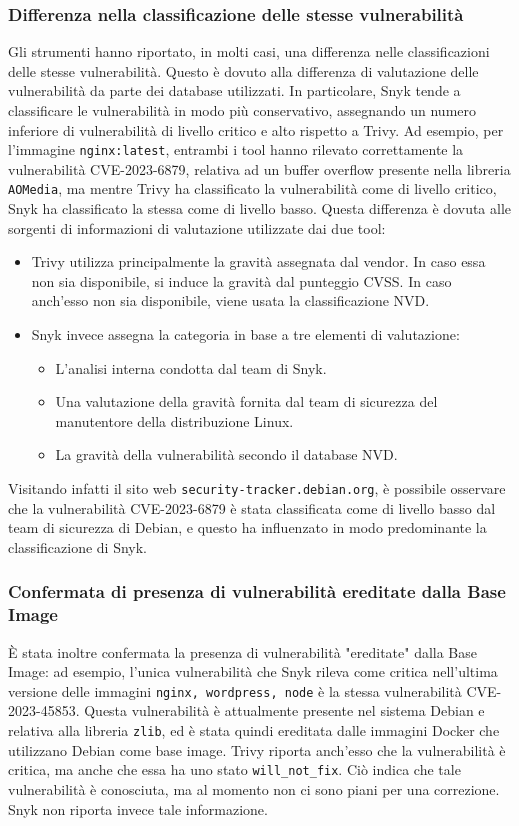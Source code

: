 \subsubsection{Differenza nella classificazione delle stesse vulnerabilità}
Gli strumenti hanno riportato, in molti casi, una differenza nelle classificazioni delle stesse vulnerabilità. Questo è dovuto alla differenza di valutazione delle vulnerabilità da parte dei database utilizzati. In particolare, Snyk tende a classificare le vulnerabilità in modo più conservativo, assegnando un numero inferiore di vulnerabilità di livello critico e alto rispetto a Trivy. Ad esempio, per l'immagine \texttt{nginx:latest}, entrambi i tool hanno rilevato correttamente la vulnerabilità CVE-2023-6879, relativa ad un buffer overflow presente nella libreria \texttt{AOMedia}, ma mentre Trivy ha classificato la vulnerabilità come di livello critico, Snyk ha classificato la stessa come di livello basso. Questa differenza è dovuta alle sorgenti di informazioni di valutazione utilizzate dai due tool:
\begin{itemize}
   \item Trivy utilizza principalmente la gravità assegnata dal vendor. In caso essa non sia disponibile, si induce la gravità dal punteggio CVSS. In caso anch'esso non sia disponibile, viene usata la classificazione NVD.
   \item Snyk invece assegna la categoria in base a tre elementi di valutazione:
         \begin{itemize}
            \item L'analisi interna condotta dal team di Snyk.
            \item Una valutazione della gravità fornita dal team di sicurezza del manutentore della distribuzione Linux.
            \item La gravità della vulnerabilità secondo il database NVD.
         \end{itemize}
\end{itemize}
Visitando infatti il sito web \texttt{security-tracker.debian.org}, è possibile osservare che la vulnerabilità CVE-2023-6879 è stata classificata come di livello basso dal team di sicurezza di Debian, e questo ha influenzato in modo predominante la classificazione di Snyk.
\subsubsection{Confermata di presenza di vulnerabilità ereditate dalla Base Image}
È stata inoltre confermata la presenza di vulnerabilità "ereditate" dalla Base Image: ad esempio, l'unica vulnerabilità che Snyk rileva come critica nell'ultima versione delle immagini \texttt{nginx, wordpress, node} è la stessa vulnerabilità CVE-2023-45853. Questa vulnerabilità è attualmente presente nel sistema Debian e relativa alla libreria \texttt{zlib}, ed è stata quindi ereditata dalle immagini Docker che utilizzano Debian come base image.
Trivy riporta anch'esso che la vulnerabilità è critica, ma anche che essa ha uno stato \texttt{will\_not\_fix}. Ciò indica che tale vulnerabilità è conosciuta, ma al momento non ci sono piani per una correzione. Snyk non riporta invece tale informazione.


